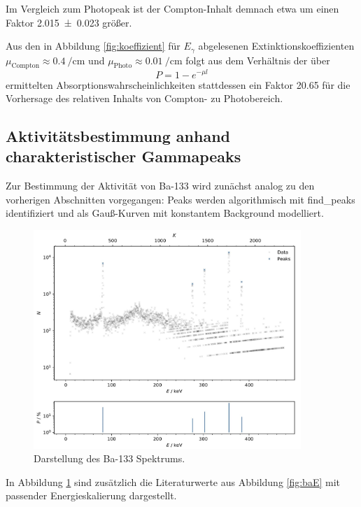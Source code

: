 Im Vergleich zum Photopeak ist der Compton-Inhalt demnach etwa um einen Faktor \num{2.015 +- 0.023} größer.

Aus den in Abbildung \ref{fig:koeffizient} für $E_\gamma$ abgelesenen Extinktionskoeffizienten
$\mu_\text{Compton} \approx \qty{0.4}{\per\centi\meter}$ und $\mu_\text{Photo} \approx \qty{0.01}{\per\centi\meter}$ 
folgt aus dem Verhältnis der über
\begin{equation*}
    P = 1 - e^{- \mu l}
\end{equation*}
ermittelten Absorptionswahrscheinlichkeiten stattdessen ein Faktor \num{20.65} für die Vorhersage des relativen Inhalts von
Compton- zu Photobereich.

\subsection{Aktivitätsbestimmung anhand charakteristischer Gammapeaks}

Zur Bestimmung der Aktivität von Ba-133 wird zunächst analog zu den vorherigen Abschnitten vorgegangen: Peaks werden
algorithmisch mit find\_peaks identifiziert und als Gauß-Kurven mit konstantem Background modelliert.

\begin{figure}[H]
    \centering
    \includegraphics[width=0.9\textwidth]{content/plots/plot10.jpg}
    \caption{Darstellung des Ba-133 Spektrums.}
    \label{fig:plot10}
\end{figure}

In Abbildung \ref{fig:plot10} sind zusätzlich die Literaturwerte aus Abbildung \ref{fig:baE} mit passender Energieskalierung
dargestellt.

